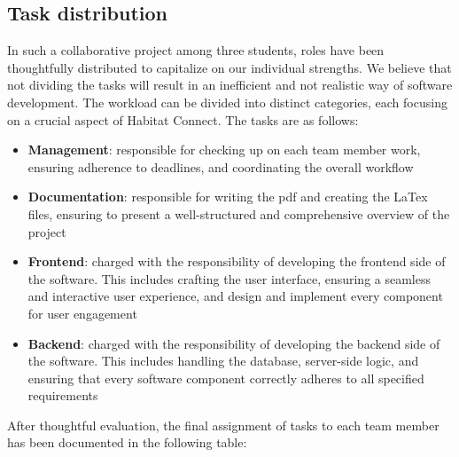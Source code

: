 \documentclass[conference]{IEEEtran}
\begin{document}
\subsection{Task distribution}
In such a collaborative project among three students, roles have been thoughtfully distributed to capitalize on our individual strengths. We believe that not dividing the tasks will result in an inefficient and not realistic way of software development. The workload can be divided into distinct categories, each focusing on a crucial aspect of Habitat Connect. The tasks are as follows:

\begin{itemize}

    \item \textbf{Management}: responsible for checking up on each team member work, ensuring adherence to deadlines, and coordinating the overall workflow
    
    \item \textbf{Documentation}: responsible for writing the pdf and creating the LaTex files, ensuring to present a well-structured and comprehensive overview of the project
    
    \item \textbf{Frontend}: charged with the responsibility of developing the frontend side of the software. This includes crafting the user interface, ensuring a seamless and interactive user experience, and design and implement every component for user engagement
    
    \item \textbf{Backend}: charged with the responsibility of developing the backend side of the software. This includes handling the database, server-side logic, and ensuring that every software component correctly adheres to all specified requirements
    
\end{itemize}

After thoughtful evaluation, the final assignment of tasks to each team member has been documented in the following table:
\end{document}
